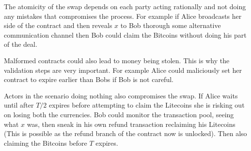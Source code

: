 The atomicity of the swap depends on each party acting rationally and not doing any mistakes that compromises the process. For example if Alice broadcasts her side of the contract and then reveals $x$ to Bob thorough some alternative communication channel then Bob could claim the Bitcoins without doing his part of the deal. 

Malformed contracts could also lead to money being stolen. This is why the validation steps are very important. For example Alice could maliciously set her contract to expire earlier than Bobs if Bob is not careful.

Actors in the scenario doing nothing also compromises the swap. If Alice waits until after $T/2$ expires before attempting to claim the Litecoins she is risking out on losing both the currencies. Bob could monitor the transaction pool, seeing what $x$ was, then sneak in his own refund transaction reclaiming his Litecoins (This is possible as the refund branch of the contract now is unlocked). Then also claiming the Bitcoins before $T$ expires.